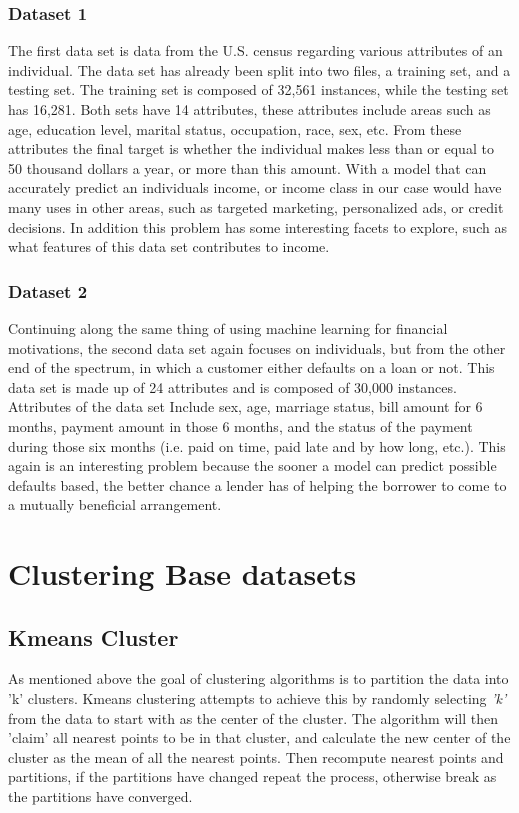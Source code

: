\documentclass[
letterpaper, %
]{IEEEtran}
\begin{document}
	\subsubsection{Dataset 1}
	The first data set is data from the U.S. census regarding various attributes of an individual. The data set has already been split into two files, a training set, and a testing set. The training set is composed of 32,561 instances, while the testing set has 16,281. Both sets have 14 attributes, these attributes include areas such as age, education level, marital status, occupation, race, sex, etc. From these attributes the final target is whether the individual makes less than or equal to 50 thousand dollars a year, or more than this amount. With a model that can accurately predict an individuals income, or income class in our case would have many uses in other areas, such as targeted marketing, personalized ads, or credit decisions. In addition this problem has some interesting facets to explore, such as what features of this data set contributes to income.
	
	\subsubsection{Dataset 2}
	Continuing along the same thing of using machine learning for financial motivations, the second data set again focuses on individuals, but from the other end of the spectrum, in which a customer either defaults on a loan or not. This data set is made up of 24 attributes and is composed of 30,000 instances. Attributes of the data set Include sex, age, marriage status, bill amount for 6 months, payment amount in those 6 months, and the status of the payment during those six months (i.e. paid on time, paid late and by how long, etc.). This again is an interesting problem because the sooner a model can predict possible defaults based, the better chance a lender has of helping the borrower to come to a mutually beneficial arrangement.
	
	\section{Clustering Base datasets}
	\subsection{Kmeans Cluster}
	As mentioned above the goal of clustering algorithms is to partition the data into 'k' clusters. Kmeans clustering attempts to achieve this by randomly selecting \emph{'k'} from the data to start with as the center of the cluster. The algorithm will then 'claim' all nearest points to be in that cluster, and calculate the new center of the cluster as the mean of all the nearest points. Then recompute nearest points and partitions, if the partitions have changed repeat the process, otherwise break as the partitions have converged.
	
\end{document}
